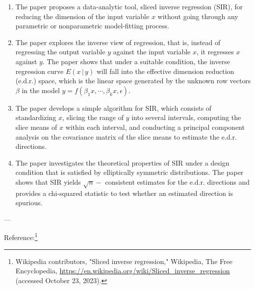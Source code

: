 \documentclass[UTF8,a4paper,10pt]{article}
\begin{document}
\begin{enumerate}
  \item The paper proposes a data-analytic tool, sliced inverse regression (SIR), for reducing the dimension of the input variable \(x\) without going through any parametric or nonparametric model-fitting process.
  \item The paper explores the inverse view of regression, that is, instead of regressing the output variable \(y\) against the input variable \(x\), it regresses \(x\) against \(y\). The paper shows that under a suitable condition, the inverse regression curve \(E(x \,|\, y)\) will fall into the effective dimension reduction (e.d.r.) space, which is the linear space generated by the unknown row vectors \(\beta\) in the model \(y = f(\beta_1 x, \cdots, \beta_k x, \epsilon)\).
  \item The paper develops a simple algorithm for SIR, which consists of standardizing \(x\), slicing the range of \(y\) into several intervals, computing the slice means of \(x\) within each interval, and conducting a principal component analysis on the covariance matrix of the slice means to estimate the e.d.r. directions.
  \item The paper investigates the theoretical properties of SIR under a design condition that is satisfied by elliptically symmetric distributions. The paper shows that SIR yields \(\sqrt{n}-\) consistent estimates for the e.d.r. directions and provides a chi-squared statistic to test whether an estimated direction is spurious.
\end{enumerate}

---

Reference:\footnote{Wikipedia contributors, "Sliced inverse regression," Wikipedia, The Free Encyclopedia, \url{https://en.wikipedia.org/wiki/Sliced_inverse_regression} (accessed October 23, 2023).}


\pagebreak
\end{document}
